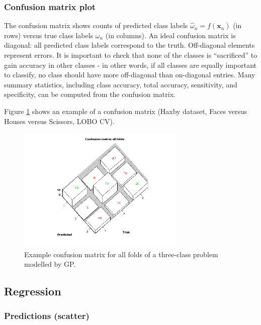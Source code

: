 \subsubsection{Confusion matrix plot}

The confusion matrix shows counts of predicted class labels $\hat{\omega}_n = f(\mathbf{x}_n)$ (in rows) versus true class labels $\omega_n$ (in columns). An ideal confusion matrix is diagonal: all predicted class labels correspond to the truth. Off-diagonal elements represent errors. It is important to check that none of the classes is
``sacrificed'' to gain accuracy in other classes - in other words, if all classes are equally
important to classify, no class should have more off-diagonal than on-diagonal entries. Many
summary statistics, including class accuracy, total accuracy, sensitivity, and specificity,
can be computed from the confusion matrix.

Figure \ref{fig_prt_ui_results_plots_confMat} shows an example of a confusion matrix (Haxby dataset, Faces versus Houses versus Scissors, LOBO CV).


\begin{figure}[h!]
\begin{center}
\includegraphics[height=6cm]{images/prt_ui_results_plots_confMat.png}
\caption{Example confusion matrix for all folds of a three-class problem modelled by GP.}
\label{fig_prt_ui_results_plots_confMat}
\end{center}
\end{figure}

\subsection{Regression}

\subsubsection{Predictions (scatter)}


